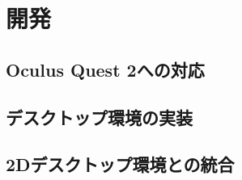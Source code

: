 \section{開発}

\subsection{Oculus Quest 2への対応}

\subsection{デスクトップ環境の実装}

\subsection{2Dデスクトップ環境との統合}
